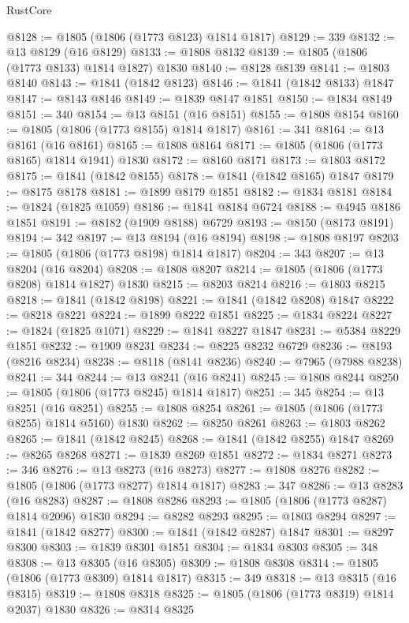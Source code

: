 \begin{lexlean}{RustCore}
\begin{coremodule}
@8128 := @1805 (@1806 (@1773 @8123) @1814 @1817)
@8129 := 339
@8132 := @13 @8129 (@16 @8129)
@8133 := @1808 @8132
@8139 := @1805 (@1806 (@1773 @8133) @1814 @1827) @1830
@8140 := @8128 @8139
@8141 := @1803 @8140
@8143 := @1841 (@1842 @8123)
@8146 := @1841 (@1842 @8133) @1847
@8147 := @8143 @8146
@8149 := @1839 @8147 @1851
@8150 := @1834 @8149
@8151 := 340
@8154 := @13 @8151 (@16 @8151)
@8155 := @1808 @8154
@8160 := @1805 (@1806 (@1773 @8155) @1814 @1817)
@8161 := 341
@8164 := @13 @8161 (@16 @8161)
@8165 := @1808 @8164
@8171 := @1805 (@1806 (@1773 @8165) @1814 @1941) @1830
@8172 := @8160 @8171
@8173 := @1803 @8172
@8175 := @1841 (@1842 @8155)
@8178 := @1841 (@1842 @8165) @1847
@8179 := @8175 @8178
@8181 := @1899 @8179 @1851
@8182 := @1834 @8181
@8184 := @1824 (@1825 @1059)
@8186 := @1841 @8184 @6724
@8188 := @4945 @8186 @1851
@8191 := @8182 (@1909 @8188) @6729
@8193 := @8150 (@8173 @8191)
@8194 := 342
@8197 := @13 @8194 (@16 @8194)
@8198 := @1808 @8197
@8203 := @1805 (@1806 (@1773 @8198) @1814 @1817)
@8204 := 343
@8207 := @13 @8204 (@16 @8204)
@8208 := @1808 @8207
@8214 := @1805 (@1806 (@1773 @8208) @1814 @1827) @1830
@8215 := @8203 @8214
@8216 := @1803 @8215
@8218 := @1841 (@1842 @8198)
@8221 := @1841 (@1842 @8208) @1847
@8222 := @8218 @8221
@8224 := @1899 @8222 @1851
@8225 := @1834 @8224
@8227 := @1824 (@1825 @1071)
@8229 := @1841 @8227 @1847
@8231 := @5384 @8229 @1851
@8232 := @1909 @8231
@8234 := @8225 @8232 @6729
@8236 := @8193 (@8216 @8234)
@8238 := @8118 (@8141 @8236)
@8240 := @7965 (@7988 @8238)
@8241 := 344
@8244 := @13 @8241 (@16 @8241)
@8245 := @1808 @8244
@8250 := @1805 (@1806 (@1773 @8245) @1814 @1817)
@8251 := 345
@8254 := @13 @8251 (@16 @8251)
@8255 := @1808 @8254
@8261 := @1805 (@1806 (@1773 @8255) @1814 @5160) @1830
@8262 := @8250 @8261
@8263 := @1803 @8262
@8265 := @1841 (@1842 @8245)
@8268 := @1841 (@1842 @8255) @1847
@8269 := @8265 @8268
@8271 := @1839 @8269 @1851
@8272 := @1834 @8271
@8273 := 346
@8276 := @13 @8273 (@16 @8273)
@8277 := @1808 @8276
@8282 := @1805 (@1806 (@1773 @8277) @1814 @1817)
@8283 := 347
@8286 := @13 @8283 (@16 @8283)
@8287 := @1808 @8286
@8293 := @1805 (@1806 (@1773 @8287) @1814 @2096) @1830
@8294 := @8282 @8293
@8295 := @1803 @8294
@8297 := @1841 (@1842 @8277)
@8300 := @1841 (@1842 @8287) @1847
@8301 := @8297 @8300
@8303 := @1839 @8301 @1851
@8304 := @1834 @8303
@8305 := 348
@8308 := @13 @8305 (@16 @8305)
@8309 := @1808 @8308
@8314 := @1805 (@1806 (@1773 @8309) @1814 @1817)
@8315 := 349
@8318 := @13 @8315 (@16 @8315)
@8319 := @1808 @8318
@8325 := @1805 (@1806 (@1773 @8319) @1814 @2037) @1830
@8326 := @8314 @8325

\end{coremodule}
\end{lexlean}
